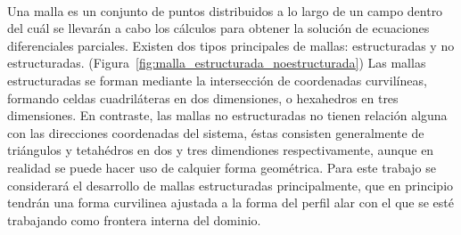\documentclass[letterpaper, openright, 12pt]{book}
\begin{document}
    \paragraph*{}
    Una malla es un conjunto de puntos distribuidos a lo largo de un campo
    dentro del cuál se llevarán a cabo los cálculos para obtener la solución
    de ecuaciones diferenciales parciales. Existen dos tipos principales de
    mallas: estructuradas y no estructuradas.
    (Figura~\ref{fig:malla_estructurada_noestructurada})
    Las mallas estructuradas se forman mediante la intersección de
    coordenadas curvilíneas, formando celdas cuadriláteras en dos
    dimensiones, o hexahedros en tres dimensiones. En contraste, las mallas
    no estructuradas no tienen relación alguna con las direcciones
    coordenadas del sistema, éstas consisten generalmente de triángulos y
    tetahédros en dos y tres dimendiones respectivamente, aunque en realidad
    se puede hacer uso de calquier forma geométrica. Para este trabajo se
    considerará el desarrollo  de  mallas estructuradas principalmente, que
    en principio tendrán una forma curvilinea ajustada a la forma del perfil
    alar con el que se esté trabajando como frontera interna del dominio.
\end{document}
